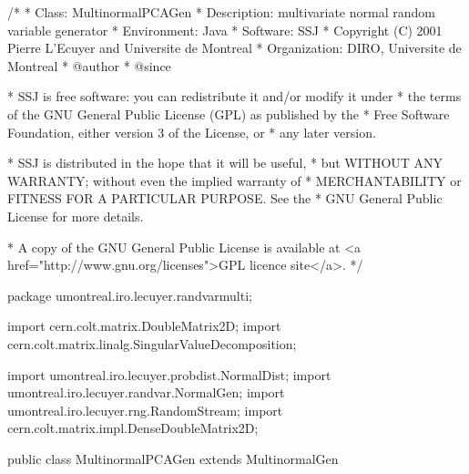 \begin{code}
\begin{hide}
/*
 * Class:        MultinormalPCAGen
 * Description:  multivariate normal random variable generator
 * Environment:  Java
 * Software:     SSJ 
 * Copyright (C) 2001  Pierre L'Ecuyer and Universite de Montreal
 * Organization: DIRO, Universite de Montreal
 * @author       
 * @since

 * SSJ is free software: you can redistribute it and/or modify it under
 * the terms of the GNU General Public License (GPL) as published by the
 * Free Software Foundation, either version 3 of the License, or
 * any later version.

 * SSJ is distributed in the hope that it will be useful,
 * but WITHOUT ANY WARRANTY; without even the implied warranty of
 * MERCHANTABILITY or FITNESS FOR A PARTICULAR PURPOSE.  See the
 * GNU General Public License for more details.

 * A copy of the GNU General Public License is available at
   <a href="http://www.gnu.org/licenses">GPL licence site</a>.
 */
\end{hide}
package umontreal.iro.lecuyer.randvarmulti;

   import cern.colt.matrix.DoubleMatrix2D;
   import cern.colt.matrix.linalg.SingularValueDecomposition;
\begin{hide}
import umontreal.iro.lecuyer.probdist.NormalDist;
import umontreal.iro.lecuyer.randvar.NormalGen;
import umontreal.iro.lecuyer.rng.RandomStream;
import cern.colt.matrix.impl.DenseDoubleMatrix2D;
\end{hide}

public class MultinormalPCAGen extends MultinormalGen\begin{hide} {
   private double[] lambda;

   private static SingularValueDecomposition getSvd (DoubleMatrix2D sigma) {
      return (new SingularValueDecomposition (sigma));
   }

   private DoubleMatrix2D decompPCA (SingularValueDecomposition svd) {
      DoubleMatrix2D D = svd.getS ();
      // Calculer la racine carree des valeurs propres
      for (int i = 0; i < D.rows(); ++i) {
         lambda[i] = D.getQuick (i, i);
         D.setQuick (i, i, Math.sqrt (D.getQuick (i, i)));
      }
      DoubleMatrix2D P = svd.getV();
      return P.zMult (D, null);
   }

   private void initL() {
      if (mu.length != sigma.rows() || mu.length != sigma.columns())
         throw new IllegalArgumentException
            ("Incompatible mean vector and covariance matrix");
      lambda = new double[mu.length];
      sqrtSigma = decompPCA (getSvd(sigma));
   }
\end{hide}\end{code}


